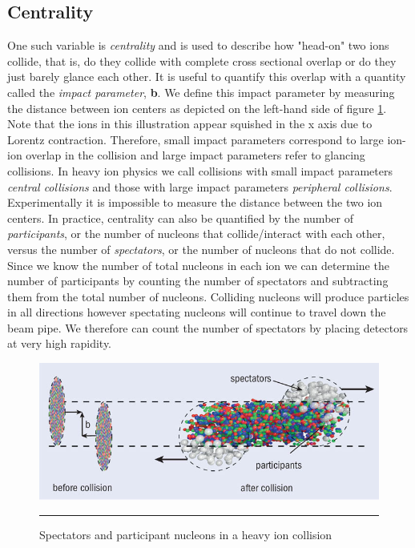 \subsection{Centrality}
One such variable is \textit{centrality} and is used to describe how "head-on" two ions collide, that is, do they collide with complete cross sectional overlap or do they just barely glance each other. It is useful to quantify this overlap with a quantity called the \textit{impact parameter}, \textbf{b}. We define this impact parameter by measuring the distance between ion centers as depicted on the left-hand side of figure \ref{fig:cernfireball}. Note that the ions in this illustration appear squished in the x axis due to Lorentz contraction. Therefore, small impact parameters correspond to large ion-ion overlap in the collision and large impact parameters refer to glancing collisions. In heavy ion physics we call collisions with small impact parameters \textit{central collisions} and those with large impact parameters \textit{peripheral collisions}. Experimentally it is impossible to measure the distance between the two ion centers. In practice, centrality can also be quantified by the number of \textit{participants}, or the number of nucleons that collide/interact with each other, versus the number of \textit{spectators}, or the number of nucleons that do not collide. Since we know the number of total nucleons in each ion we can determine the number of participants by counting the number of spectators and subtracting them from the total number of nucleons. Colliding nucleons will produce particles in all directions however spectating nucleons will continue to travel down the beam pipe. We therefore can count the number of spectators by placing detectors at very high rapidity.

\begin{figure}[htbp!]
  \centering
    \includegraphics[width=1\textwidth]{Figures/spectatorsvsparticipants.jpg}
    \rule{35em}{0.5pt}
  \caption[Spectators and participant nucleons in a heavy ion collision]{Spectators and participant nucleons in a heavy ion collision \citep{cernhifireball}}
  \label{fig:cernfireball}
\end{figure}

